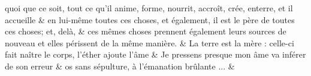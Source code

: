 \documentclass[12pt,onecolumn,twoside,a4paper]{memoir}
\begin{document}
\begin{pairs}
\begin{Rightside}
                         \stanza quoi que ce soit, tout ce qu’il anime, forme, nourrit, accroît, crée,
                              enterre, et il accueille  & en lui-même toutes ces choses, et également, il est le père de toutes
                              ces choses; et, delà, & 
                     ces mêmes choses prennent également leurs sources de nouveau et elles
                              périssent de la même manière. \&
                         \stanza 
                      La terre est la mère : celle-ci fait naître le corps, l’éther ajoute
                              l’âme \&
                         \stanza 
                     Je pressens presque mon âme va inférer de son erreur \&
                         \stanza 
                     os sans sépulture, à l’émanation brûlante ... \&
                     
                  \endnumbering
		\end{Rightside}
               \end{pairs}
	\Columns
            
            
\end{document}
